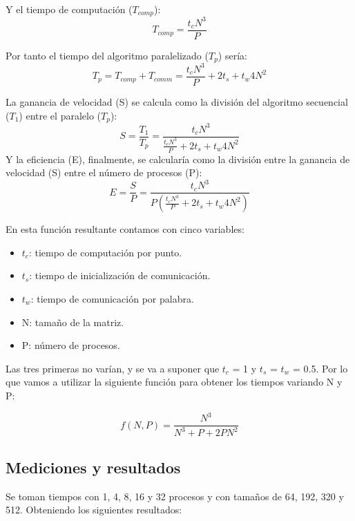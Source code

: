 \documentclass[10pt,twocolumn,a4paper]{article}
\begin{document}
Y el tiempo de computación ($T_{comp}$):
\begin{equation}
	T_{comp} = \frac{t_{c}N^{3}}{P} 
\end{equation}

Por tanto el tiempo del algoritmo paralelizado ($T_{p}$) sería:
\begin{equation}
	T_{p} = T_{comp} + T_{comm} = \frac{t_{c}N^{3}}{P} + 2t_{s} + t_{w}4N^{2}
\end{equation}

La ganancia de velocidad (S) se calcula como la división del algoritmo secuencial ($T_{1}$) entre el paralelo ($T_{p}$):
\begin{equation}
	S = \frac{T_{1}}{T_{p}} = \frac{t_{c}N^{3}}{\frac{t_{c}N^{3}}{P} + 2t_{s} + t_{w}4N^{2}}
\end{equation}
Y la eficiencia (E), finalmente, se calcularía como la división entre la ganancia de velocidad (S) entre el número de procesos (P):
\begin{equation}
	E = \frac{S}{P} = \frac{t_{c}N^{3}}{P( \frac{t_{c}N^{3}}{P} + 2t_{s} + t_{w}4N^{2})}
\end{equation}

En esta función resultante contamos con cinco variables:
\begin{itemize}
	\item $t_{c}$: tiempo de computación por punto.
	\item $t_{s}$: tiempo de inicialización de comunicación.
	\item $t_{w}$: tiempo de comunicación por palabra.
	\item N: tamaño de la matriz.
	\item P: número de procesos.
\end{itemize}

Las tres primeras no varían, y se va a suponer que $t_{c}$ = 1 y $t_{s}$ = $t_{w}$ = 0.5. Por lo que vamos a utilizar la siguiente función para obtener los tiempos variando N y P:

\begin{equation}
	f(N,P) = \frac{N^{3}}{N^{3} + P + 2PN^{2}}
\end{equation}
\subsection{Mediciones y resultados}
Se toman tiempos con 1, 4, 8, 16 y 32 procesos y con tamaños de 64, 192, 320 y 512. Obteniendo los siguientes resultados: \\ \\
\end{document}
